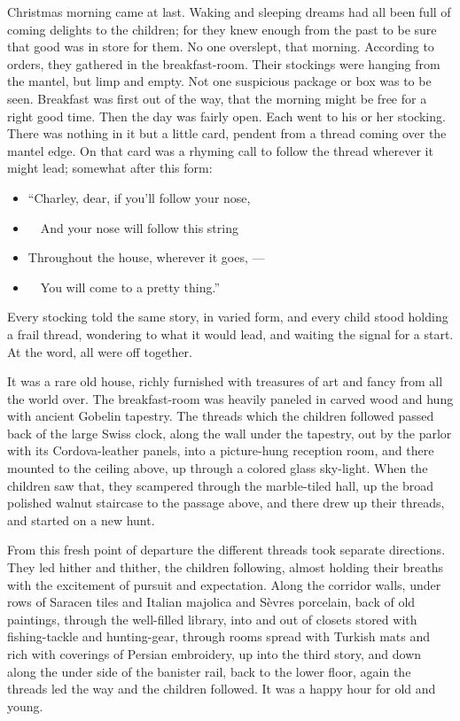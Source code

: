 \documentclass[
]{book}
\providecommand{\tightlist}{%
  \setlength{\itemsep}{0pt}\setlength{\parskip}{0pt}}
\begin{document}
Christmas morning came at last. Waking and sleeping dreams had all been full of coming delights to the children; for they knew enough from the past to be sure that good was in store for them. No one overslept, that morning. According to orders, they gathered in the breakfast-room. Their stockings were hanging from the mantel, but limp and empty. Not one suspicious package or box was to be seen. Breakfast was first out of the way, that the morning might be free for a right good time. Then the day was fairly open. Each went to his or her stocking. There was nothing in it but a little card, pendent from a thread coming over the mantel edge. On that card was a rhyming call to follow the thread wherever it might lead; somewhat after this form:

\begin{itemize}
\tightlist
\item
  ``Charley, dear, if you'll follow your nose,
\item
  ~~And your nose will follow this string
\item
  Throughout the house, wherever it goes, ---
\item
  ~~You will come to a pretty thing.''
\end{itemize}

Every stocking told the same story, in varied form, and every child stood holding a frail thread, wondering to what it would lead, and waiting the signal for a start. At the word, all were off together.

It was a rare old house, richly furnished with treasures of art and fancy from all the world over. The breakfast-room was heavily paneled in carved wood and hung with ancient Gobelin tapestry. The threads which the children followed passed back of the large Swiss clock, along the wall under the tapestry, out by the parlor with its Cordova-leather panels, into a picture-hung reception room, and there mounted to the ceiling above, up through a colored glass sky-light. When the children saw that, they scampered through the marble-tiled hall, up the broad polished walnut staircase to the passage above, and there drew up their threads, and started on a new hunt.

From this fresh point of departure the different threads took separate directions. They led hither and thither, the children following, almost holding their breaths with the excitement of pursuit and expectation. Along the corridor walls, under rows of Saracen tiles and Italian majolica and Sèvres porcelain, back of old paintings, through the well-filled library, into and out of closets stored with fishing-tackle and hunting-gear, through rooms spread with Turkish mats and rich with coverings of Persian embroidery, up into the third story, and down along the under side of the banister rail, back to the lower floor, again the threads led the way and the children followed. It was a happy hour for old and young.
\end{document}
